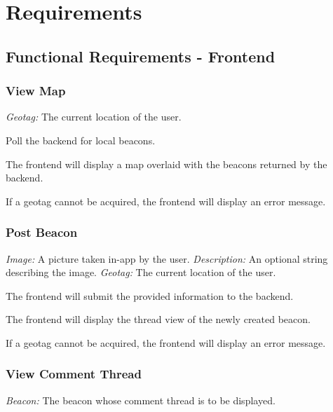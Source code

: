 \section{Requirements}
    \subsection{Functional Requirements - Frontend}
        \subsubsection{View Map}
                \textit{Geotag:} The current location of the user.

                Poll the backend for local beacons.

                The frontend will display a map overlaid with the beacons returned
                by the backend.

                If a geotag cannot be acquired, the frontend will display an error
                message. \newline
                

        \subsubsection{Post Beacon}
                \textit{Image:} A picture taken in-app by the user. \newline
                \textit{Description:} An optional string describing the image. \newline
                \textit{Geotag:} The current location of the user.

                The frontend will submit the provided information to the backend.

                The frontend will display the thread view of the newly created beacon.

                If a geotag cannot be acquired, the frontend will display an error
                message. \newline
                

        \subsubsection{View Comment Thread}
                \textit{Beacon:} The beacon whose comment thread is to be displayed.

